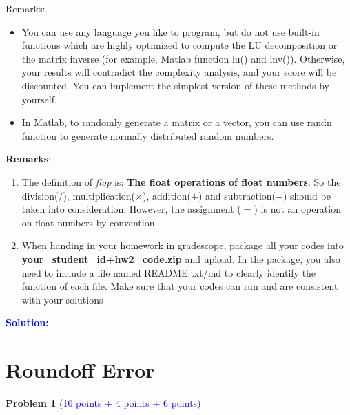 \documentclass[english,onecolumn]{IEEEtran}
\begin{document}
\begin{enumerate}
Remarks:
\begin{itemize}
  \item You can use any language you like to program, but do not use built-in functions which are highly optimized to compute the LU decomposition or the matrix inverse (for example, {\sf Matlab} function {\sf lu()} and {\sf inv()}). Otherwise, your results will contradict the complexity analysis, and your score will be discounted. You can implement the simplest version of these methods by yourself. 
  \item In {\sf Matlab}, to randomly generate a matrix or a vector, you can use {\sf randn} function to generate normally distributed random numbers.
\end{itemize}
\end{enumerate} 

\textbf{Remarks}:
\begin{enumerate}
    \item The definition of \emph{flop} is: \textbf{The float operations of float numbers}. So the division($/$), multiplication($\times$), addition($+$) and subtraction($-$) should be taken into consideration. However, the assignment ($=$) is not an operation on float numbers by convention.
    \item When handing in your homework in gradescope, package all your codes into {\bf your\_student\_id+hw2\_code.zip} and upload. In the package, you also need to include a file named README.txt/md to clearly identify the function of each file. Make sure that your codes can run and are consistent with your solutions
\end{enumerate}

\noindent\textcolor{blue}{
{\bf Solution:}
}

\newpage
\section{Roundoff Error}

\noindent\textbf{Problem 1} \textcolor{blue}{(10 points + 4 points + 6 points)}
\end{document}
